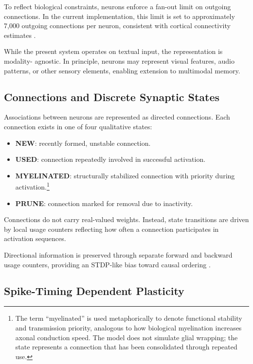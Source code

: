 \documentclass[11pt]{article}
\begin{document}
To reflect biological constraints, neurons enforce a fan-out limit on outgoing
connections. In the current implementation, this limit is set to approximately
7,000 outgoing connections per neuron, consistent with cortical connectivity estimates \citep{braitenberg1998cortex}.

While the present system operates on textual input, the representation is modality-
agnostic. In principle, neurons may represent visual features, audio patterns, or
other sensory elements, enabling extension to multimodal memory.

\subsection{Connections and Discrete Synaptic States}

Associations between neurons are represented as directed connections.
Each connection exists in one of four qualitative states:

\begin{itemize}
\item \textbf{NEW}: recently formed, unstable connection.
\item \textbf{USED}: connection repeatedly involved in successful activation.
\item \textbf{MYELINATED}: structurally stabilized connection with priority during activation.\footnote{The term ``myelinated'' is used metaphorically to denote functional stability and transmission priority, analogous to how biological myelination increases axonal conduction speed. The model does not simulate glial wrapping; the state represents a connection that has been consolidated through repeated use.}
\item \textbf{PRUNE}: connection marked for removal due to inactivity.
\end{itemize}

Connections do not carry real-valued weights.
Instead, state transitions are driven by local usage counters reflecting how often
a connection participates in activation sequences.

Directional information is preserved through separate forward and backward usage
counters, providing an STDP-like bias toward causal ordering \citep{markram1997regulation}.

\subsection{Spike-Timing Dependent Plasticity}
\end{document}
